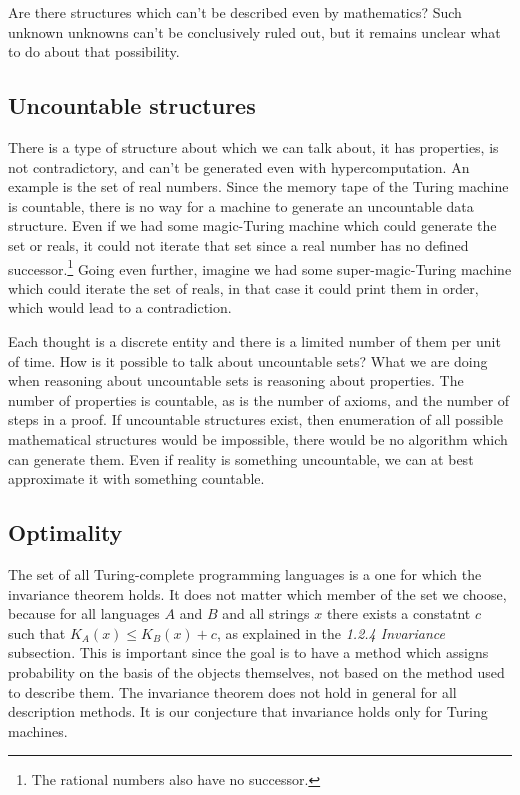 Are there structures which can't be described even by mathematics?
Such unknown unknowns can't be conclusively ruled out, but it remains unclear what to do about that possibility.

\newpage

\subsection{Uncountable structures}

There is a type of structure about which we can talk about, it has properties, is not contradictory, and can't be generated even with hypercomputation.
An example is the set of real numbers. 
Since the memory tape of the Turing machine is countable, there is no way for a machine to generate an uncountable data structure.
Even if we had some magic-Turing machine which could generate the set or reals, it could not iterate that set since a real number has no defined successor.\footnote{The rational numbers also have no successor.}
Going even further, imagine we had some super-magic-Turing machine which could iterate the set of reals, in that case it could print them in order, which would lead to a contradiction.

Each thought is a discrete entity and there is a limited number of them per unit of time.
How is it possible to talk about uncountable sets?
What we are doing when reasoning about uncountable sets is reasoning about properties.
The number of properties is countable, as is the number of axioms, and the number of steps in a proof.
If uncountable structures exist, then enumeration of all possible mathematical structures would be impossible, there would be no algorithm which can generate them.
Even if reality is something uncountable, we can at best approximate it with something countable.

\newpage

\subsection{Optimality}

The set of all Turing-complete programming languages is a one for which the invariance theorem holds.
It does not matter which member of the set we choose, because for all languages $A$ and $B$ and all strings $x$ there exists a constatnt $c$ such that $K_A(x) \leq K_B(x) + c$, as explained in the \textit{1.2.4 Invariance} subsection.
This is important since the goal is to have a method which assigns probability on the basis of the objects themselves, not based on the method used to describe them.
The invariance theorem does not hold in general for all description methods.
It is our conjecture that invariance holds only for Turing machines.

